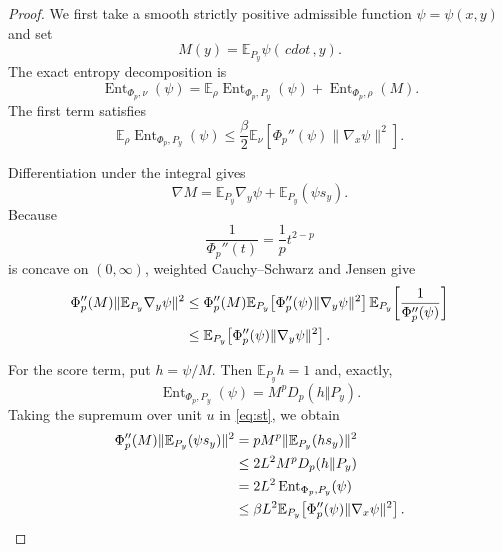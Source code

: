\documentclass[11pt]{article}
\theoremstyle{remark}
\newcommand{\E}{\mathbb E}
\newcommand{\Ent}{\operatorname{Ent}}
\newcommand{\norm}[1]{\lVert#1\rVert}
\newcommand{\phip}{\Phi_p}
\begin{document}
\begin{proof}
We first take a smooth strictly positive admissible function
$\psi=\psi(x,y)$ and set
\[
 M(y)=\E_{P_y}\psi(\,cdot\,,y).
\]
The exact entropy decomposition is
\begin{equation}
 \Ent_{\phip,\nu}(\psi)
 =\E_\rho\Ent_{\phip,P_y}(\psi)
  +\Ent_{\phip,\rho}(M).
 \label{eq:decomp}
\end{equation}
The first term satisfies
\begin{equation}
 \E_\rho\Ent_{\phip,P_y}(\psi)
 \leq\frac{\beta}{2}\E_\nu\!\left[
  \phip''(\psi)\norm{\nabla_x\psi}^2\right].
 \label{eq:first}
\end{equation}

Differentiation under the integral gives
\begin{equation}
 \nabla M=\E_{P_y}\nabla_y\psi+\E_{P_y}(\psi s_y).
 \label{eq:gradM}
\end{equation}
Because
\[
 \frac1{\phip''(t)}=\frac1p t^{2-p}
\]
is concave on $(0,\infty)$, weighted Cauchy--Schwarz and Jensen give
\begin{align}
 \phip''(M)\norm{\E_{P_y}\nabla_y\psi}^2
 &\leq \phip''(M)
 \E_{P_y}\!\left[\phip''(\psi)\norm{\nabla_y\psi}^2\right]
 \E_{P_y}\!\left[\frac1{\phip''(\psi)}\right] \notag\\
 &\leq \E_{P_y}\!\left[
 \phip''(\psi)\norm{\nabla_y\psi}^2\right].
 \label{eq:direct-y}
\end{align}

For the score term, put $h=\psi/M$.  Then $\E_{P_y}h=1$ and, exactly,
\begin{equation}
 \Ent_{\phip,P_y}(\psi)=M^pD_p(h\Vert P_y).
 \label{eq:homogeneity}
\end{equation}
Taking the supremum over unit $u$ in \eqref{eq:st}, we obtain
\begin{align}
 \phip''(M)\norm{\E_{P_y}(\psi s_y)}^2
 &=pM^p\norm{\E_{P_y}(h s_y)}^2 \notag\\
 &\leq 2L^2M^pD_p(h\Vert P_y)\notag\\
 &=2L^2\Ent_{\phip,P_y}(\psi)\notag\\
 &\leq \beta L^2\E_{P_y}\!\left[
 \phip''(\psi)\norm{\nabla_x\psi}^2\right].
 \label{eq:score}
\end{align}


\end{proof}
\end{document}
